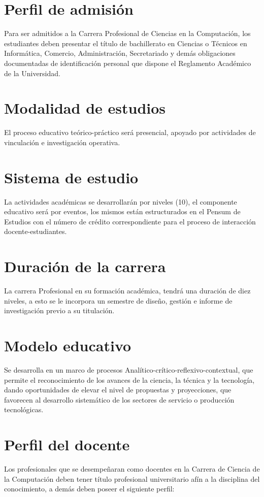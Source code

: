 \section{Perfil de admisión}
Para ser admitidos a la Carrera Profesional de Ciencias en la Computación, los estudiantes deben 
presentar el título de bachillerato en Ciencias o Técnicos en Informática, Comercio, Administración, 
Secretariado y demás obligaciones documentadas de identificación personal que dispone el Reglamento 
Académico de la Universidad.

\section{Modalidad de estudios}
El proceso educativo teórico-práctico será presencial, apoyado por actividades de vinculación e investigación
operativa.

\section{Sistema de estudio}
La actividades académicas se desarrollarán por niveles (10), el componente educativo será por eventos, 
los mismos están estructurados en el Pensum de Estudios con el número de crédito correspondiente 
para el proceso de interacción docente-estudiantes.

\section{Duración de la carrera}
La carrera Profesional en su formación académica, tendrá una duración de diez niveles, a esto se 
le incorpora un semestre de diseño, gestión e informe de investigación previo a su titulación.

\section{Modelo educativo}
Se desarrolla en un marco de procesos Analítico-crítico-reflexivo-contextual, que permite el reconocimiento 
de los avances de la ciencia, la técnica y la tecnología, dando oportunidades de elevar el 
nivel de propuestas y proyecciones, que favorecen al desarrollo sistemático de los sectores de servicio 
o producción tecnológicas.

\section{Perfil del docente}
Los profesionales que se desempeñaran como docentes en la Carrera de Ciencia de la Computación 
deben tener título profesional universitario afín a la disciplina del conocimiento, a demás deben poseer 
el siguiente perfil:

